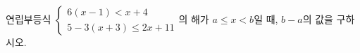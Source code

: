연립부등식 $\begin{cases} 6(x-1)<x+4 \\ 5-3(x+3)\le 2x+11 \end{cases}$의 해가 $a\le x<b$일 때, $b-a$의 값을 구하시오.

